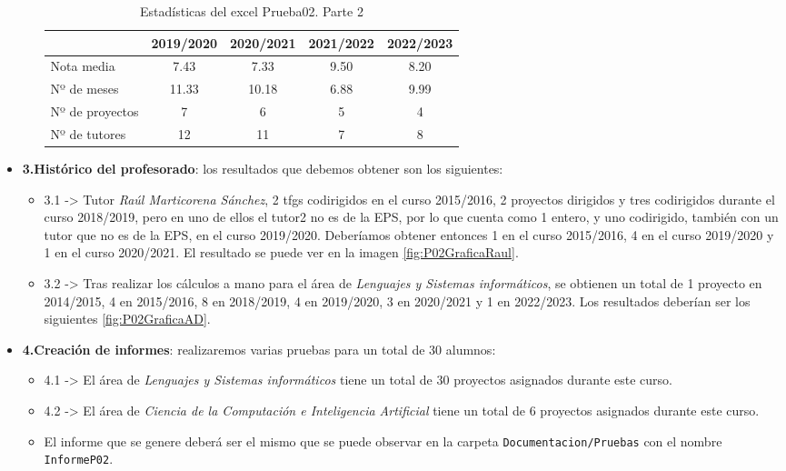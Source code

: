 \begin{itemize}
\begin{itemize}
	\begin{table}[]
		\label{P02Historico2}
		\centering
		\begin{tabular}{|l|c|c|c|c|}
			\hline
			\multicolumn{1}{|c|}{\textbf{}} & \textbf{2019/2020}
			& \textbf{2020/2021}	& \textbf{2021/2022} & \textbf{2022/2023}\\\hline
			Nota media & 7.43 &7.33 & 9.50& 8.20 \\ \hline
			Nº de meses  & 11.33 & 10.18& 6.88	& 9.99 \\ \hline
			Nº de proyectos    &7  &6 & 5	&4  \\ \hline
			Nº de tutores  & 12 &11 & 7	& 8   \\ \hline
		\end{tabular}
		\caption{Estadísticas del excel Prueba02. Parte 2}
	\end{table}
		
	\end{itemize}
	
	\item \textbf{3.Histórico del profesorado}:  los resultados que debemos obtener son los siguientes:
	\begin{itemize}
		\item 3.1 -> Tutor \emph{Raúl Marticorena Sánchez}, 2 tfgs codirigidos en el curso 2015/2016, 2 proyectos dirigidos y tres codirigidos durante el curso 2018/2019, pero en uno de ellos el tutor2 no es de la EPS, por lo que cuenta como 1 entero, y uno codirigido, también con un tutor que no es de la EPS, en el curso 2019/2020. Deberíamos obtener entonces 1 en el curso 2015/2016, 4 en el curso 2019/2020 y 1 en el curso 2020/2021. El resultado se puede ver en la imagen \ref{fig:P02GraficaRaul}.
		
		\item 3.2 -> Tras realizar los cálculos a mano para el área de  \emph{Lenguajes y Sistemas informáticos}, se obtienen un total de 1 proyecto en 2014/2015, 4 en 2015/2016, 8 en 2018/2019, 4 en 2019/2020, 3 en 2020/2021 y 1 en 2022/2023. Los resultados deberían ser los siguientes \ref{fig:P02GraficaAD}.
	\end{itemize}	
	
	\item \textbf{4.Creación de informes}: realizaremos varias pruebas para un total de 30 alumnos:
	\begin{itemize}
		\item 4.1 -> El área de \emph{Lenguajes y Sistemas informáticos} tiene un total de 30 proyectos asignados durante este curso.
		\item 4.2 -> El área de \emph{Ciencia de la Computación e Inteligencia Artificial} tiene un total de 6 proyectos asignados durante este curso.
		\item El informe que se genere deberá ser el mismo que se puede observar en la carpeta \texttt{Documentacion/Pruebas} con el nombre \texttt{InformeP02}.
	\end{itemize}
\end{itemize}

